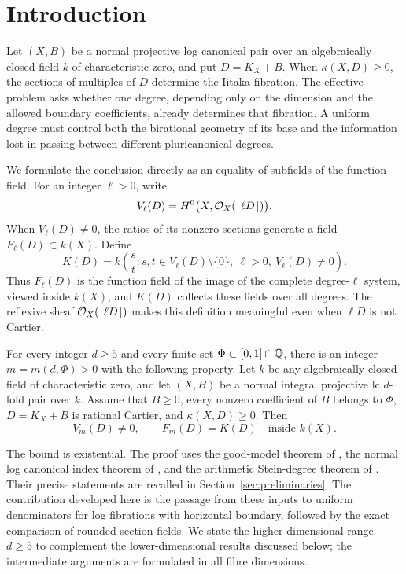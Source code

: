 \section{Introduction}\label{sec:introduction}

Let $(X,B)$ be a normal projective log canonical pair over an algebraically
closed field $k$ of characteristic zero, and put
$D=K_X+B$. When $\kappa(X,D)\geq0$, the sections of multiples of $D$
determine the Iitaka fibration. The effective problem asks whether one
degree, depending only on the dimension and the allowed boundary
coefficients, already determines that fibration. A uniform degree must
control both the birational geometry of its base and the information
lost in passing between different pluricanonical degrees.

We formulate the conclusion directly as an equality of subfields of
the function field. For an integer $\ell>0$, write
\[
             V_\ell(D)=H^0\bigl(X,\mathcal O_X(\left\lfloor \ell D\right\rfloor)\bigr).
\]
When $V_\ell(D)\neq0$, the ratios of its nonzero sections generate a
field $F_\ell(D)\subset k(X)$. Define
\[
 K(D)=k\left(\frac{s}{t}:
       s,t\in V_\ell(D)\setminus\{0\},\
       \ell>0,\ V_\ell(D)\neq0\right).
\]
Thus $F_\ell(D)$ is the function field of the image of the complete
degree-$\ell$ system, viewed inside $k(X)$, and $K(D)$ collects these
fields over all degrees. The reflexive sheaf
$\mathcal O_X(\left\lfloor \ell D\right\rfloor)$ makes this definition meaningful even when
$\ell D$ is not Cartier.

\begin{theorem}\label{thm:main}
For every integer $d\geq5$ and every finite set
$\Phi\subset[0,1]\cap\mathbb Q$, there is an integer $m=m(d,\Phi)>0$
with the following property. Let $k$ be any algebraically closed field
of characteristic zero, and let $(X,B)$ be a normal integral projective
lc $d$-fold pair over $k$. Assume that $B\geq0$, every nonzero coefficient
of $B$ belongs to $\Phi$, $D=K_X+B$ is rational Cartier, and
$\kappa(X,D)\geq0$. Then
\[
                       V_m(D)\neq0,\qquad F_m(D)=K(D)
                       \quad\text{inside }k(X).
\]
\end{theorem}

The bound is existential. The proof uses the good-model theorem of
\cite{LA}, the normal log canonical index theorem of \cite{U}, and
the arithmetic Stein-degree theorem of \cite{SD}. Their precise
statements are recalled in Section~\ref{sec:preliminaries}.
The contribution developed here is the passage from these inputs to
uniform denominators for log fibrations with horizontal boundary,
followed by the exact comparison of rounded section fields.
We state the higher-dimensional range $d\geq5$ to complement the
lower-dimensional results discussed below; the intermediate arguments
are formulated in all fibre dimensions.


